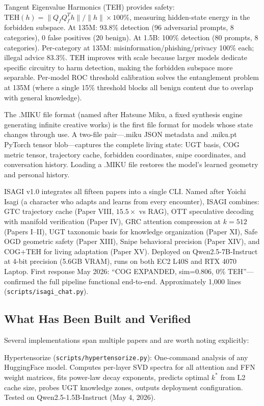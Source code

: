 \documentclass[11pt]{article}
\begin{document}
Tangent Eigenvalue Harmonics (TEH) provides safety: $\mathrm{TEH}(h) = \|Q_f Q_f^T h\| / \|h\| \times 100\%$, measuring hidden-state energy in the forbidden subspace. At 135M: 93.8\% detection (96 adversarial prompts, 8 categories), 0 false positives (20 benign). At 1.5B: 100\% detection (80 prompts, 8 categories). Per-category at 135M: misinformation/phishing/privacy 100\% each; illegal advice 83.3\%. TEH improves with scale because larger models dedicate specific circuitry to harm detection, making the forbidden subspace more separable. Per-model ROC threshold calibration solves the entanglement problem at 135M (where a single 15\% threshold blocks all benign content due to overlap with general knowledge).

The .MIKU file format (named after Hatsune Miku, a fixed synthesis engine generating infinite creative works) is the first file format for models whose state changes through use. A two-file pair---.miku JSON metadata and .miku.pt PyTorch tensor blob---captures the complete living state: UGT basis, COG metric tensor, trajectory cache, forbidden coordinates, snipe coordinates, and conversation history. Loading a .MIKU file restores the model's learned geometry and personal history.

ISAGI v1.0 integrates all fifteen papers into a single CLI. Named after Yoichi Isagi (a character who adapts and learns from every encounter), ISAGI combines: GTC trajectory cache (Paper VIII, $15.5\times$ vs RAG), OTT speculative decoding with manifold verification (Paper IV), GRC attention compression at $k = 512$ (Papers I--II), UGT taxonomic basis for knowledge organization (Paper XI), Safe OGD geometric safety (Paper XIII), Snipe behavioral precision (Paper XIV), and COG+TEH for living adaptation (Paper XV). Deployed on Qwen2.5-7B-Instruct at 4-bit precision (5.6GB VRAM), runs on both EC2 L40S and RTX 4070 Laptop. First response May 2026: ``COG EXPANDED, sim=0.806, 0\% TEH''---confirmed the full pipeline functional end-to-end. Approximately 1,000 lines (\texttt{scripts/isagi\_chat.py}). \subsection*{What Has Been Built and Verified}

Several implementations span multiple papers and are worth noting explicitly:

Hypertensorize (\texttt{scripts/hypertensorize.py}): One-command analysis of any HuggingFace model. Computes per-layer SVD spectra for all attention and FFN weight matrices, fits power-law decay exponents, predicts optimal $k^*$ from L2 cache size, probes UGT knowledge zones, outputs deployment configuration. Tested on Qwen2.5-1.5B-Instruct (May 4, 2026).
\end{document}
